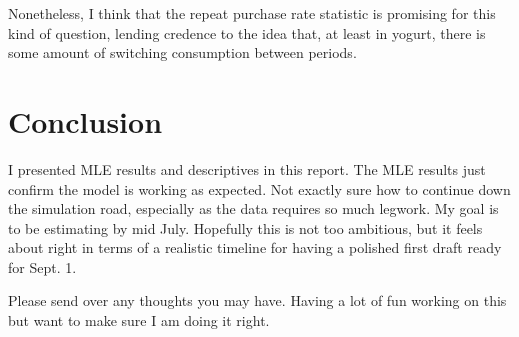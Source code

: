 \documentclass[11pt]{article}
\theoremstyle{definition}
\theoremstyle{remark}
\begin{document}
Nonetheless, I think that the repeat purchase rate statistic is promising for this kind of question, lending credence to the idea that, at least in yogurt, there is some amount of switching consumption between periods.

\section{Conclusion}

I presented MLE results and descriptives in this report. The MLE results just confirm the model is working as expected. Not exactly sure how to continue down the simulation road, especially as the data requires so much legwork. My goal is to be estimating by mid July. Hopefully this is not too ambitious, but it feels about right in terms of a realistic timeline for having a polished first draft ready for Sept. 1. 

Please send over any thoughts you may have. Having a lot of fun working on this but want to make sure I am doing it right.
\end{document}
